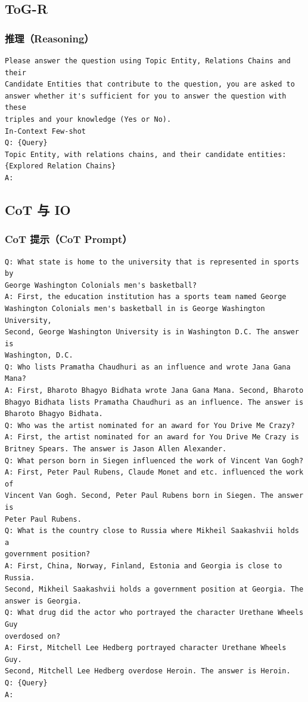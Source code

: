 \documentclass[11pt,UTF8,fontset=fandol]{ctexart}
\begin{document}
\subsection{ToG-R}

\subsubsection{推理（Reasoning）}
\begin{verbatim}
Please answer the question using Topic Entity, Relations Chains and their
Candidate Entities that contribute to the question, you are asked to
answer whether it's sufficient for you to answer the question with these
triples and your knowledge (Yes or No).
In-Context Few-shot
Q: {Query}
Topic Entity, with relations chains, and their candidate entities:
{Explored Relation Chains}
A:
\end{verbatim}

\subsection{CoT 与 IO}

\subsubsection{CoT 提示（CoT Prompt）}
\begin{verbatim}
Q: What state is home to the university that is represented in sports by
George Washington Colonials men's basketball?
A: First, the education institution has a sports team named George
Washington Colonials men's basketball in is George Washington University,
Second, George Washington University is in Washington D.C. The answer is
Washington, D.C.
Q: Who lists Pramatha Chaudhuri as an influence and wrote Jana Gana Mana?
A: First, Bharoto Bhagyo Bidhata wrote Jana Gana Mana. Second, Bharoto
Bhagyo Bidhata lists Pramatha Chaudhuri as an influence. The answer is
Bharoto Bhagyo Bidhata.
Q: Who was the artist nominated for an award for You Drive Me Crazy?
A: First, the artist nominated for an award for You Drive Me Crazy is
Britney Spears. The answer is Jason Allen Alexander.
Q: What person born in Siegen influenced the work of Vincent Van Gogh?
A: First, Peter Paul Rubens, Claude Monet and etc. influenced the work of
Vincent Van Gogh. Second, Peter Paul Rubens born in Siegen. The answer is
Peter Paul Rubens.
Q: What is the country close to Russia where Mikheil Saakashvii holds a
government position?
A: First, China, Norway, Finland, Estonia and Georgia is close to Russia.
Second, Mikheil Saakashvii holds a government position at Georgia. The
answer is Georgia.
Q: What drug did the actor who portrayed the character Urethane Wheels Guy
overdosed on?
A: First, Mitchell Lee Hedberg portrayed character Urethane Wheels Guy.
Second, Mitchell Lee Hedberg overdose Heroin. The answer is Heroin.
Q: {Query}
A:
\end{verbatim}
\end{document}
